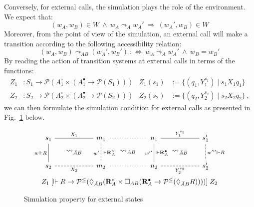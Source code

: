 \documentclass[acmsmall,screen,review,anonymous]{acmart}
\newcommand{\que}{\circ}
\newcommand{\ans}{\bullet}
\begin{document}
Conversely, for external calls,
the simulation plays the role of the environment.
We expect that:
\[
  (w_A, w_B) \in W \:\wedge\:
  w_A \leadsto_A w_A' \:\Rightarrow\:
  (w_A', w_B) \in W
\]
Moreover,
from the point of view of the simulation,
an external call will make a transition according to
the following accessibility relation:
\[
  (w_A, w_B) \leadsto_{AB} (w_A', w_B') \::\Leftrightarrow\:
  w_A \leadsto_A w_A' \:\wedge\:
  w_B = w_B'
\]
By reading the action of transition systems at external calls
in terms of the functions:
\begin{align*}
  Z_1 &: S_1 \rightarrow
    \mathcal{P}(A_1^\que \times (A_1^\ans \rightarrow \mathcal{P}(S_1))) &
  Z_1(s_1) &:= \{ (q_1, Y_1^{s_1}) \mid s_1 \mathrel{X_1} q_1 \}
 \\
  Z_2 &: S_2 \rightarrow
    \mathcal{P}(A_2^\que \times (A_2^\ans \rightarrow \mathcal{P}(S_2))) &
  Z_2(s_2) &:= \{ (q_2, Y_2^{s_2}) \mid s_2 \mathrel{X_2} q_2 \}
  \,,
\end{align*}
we can then formulate the simulation condition for external calls
as presented in Fig.~\ref{fig:simext} below.

\begin{figure}[h] %
  \[
    \begin{array}{c}
      \begin{tikzcd}[sep=tiny, column sep=small]
        s_1 \ar[rr, "X_1", dash] \ar[dd, "w \Vdash R"', dash] &&
        m_1 \ar[rr, dotted, dash] \ar[dd, "w'"', "{} \Vdash \mathbf{R}_A^\que", dash, dashed] &&
        n_1 \ar[rr, "Y_1^{s_1}", dash] \ar[dd, "w''"', "{} \Vdash \mathbf{R}_A^\ans", dash] &&
        s_1' \ar[dd, "w''' \Vdash R", dash, dashed]
        \\
        & \leadsto_{\bar{A}B} && \leadsto_{AB} && \leadsto_{\bar{A}B} &
        \\
        s_2 \ar[rr, "X_2"', dash, dashed] &&
        m_2 \ar[rr, dotted, dash] &&
        n_2 \ar[rr, "Y_2^{s_2}"', dash, dashed] &&
        s_2'
      \end{tikzcd}
      \vspace{1ex} \\
      Z_1
      \mathrel{[
        \Vdash R \rightarrow \mathcal{P}^\le(
          \Diamond_{\bar{A}B} (
          \mathbf{R}_A^\que \times
            \Box_{AB} (
            \mathbf{R}_A^\ans \rightarrow
            \mathcal{P}^\le(\Diamond_{\bar{A}B} R))))
      ]}
      Z_2
    \end{array}
  \]
  \caption{Simulation property for external states}
  \label{fig:simext}
\end{figure}
\end{document}
